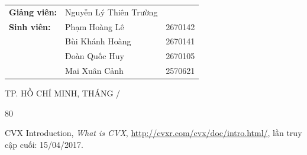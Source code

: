 \documentclass[a4paper,12pt]{article}
\begin{document}
\begin{titlepage}
\begin{minipage}{0.85\textwidth}
\raggedright

\begin{tabular}{@{}llr@{}}

\textbf{Giảng viên:}
    & Nguyễn Lý Thiên Trường & \\[6pt]

\textbf{Sinh viên:}
    & Phạm Hoàng Lê & 2670142 \\[4pt]

    & Bùi Khánh Hoàng & 2670141 \\[4pt]

    & Đoàn Quốc Huy & 2670105 \\[4pt]

    & Mai Xuân Cảnh & 2570621 \\

\end{tabular}

\end{minipage}

\vspace{1.2cm}

{\small
TP. HỒ CHÍ MINH,
THÁNG \the\month/\the\year\par}

\end{titlepage}



\tableofcontents
\clearpage

\listoffigures
\clearpage

\listoftables
\clearpage











\clearpage
{}
{}

\begin{thebibliography}{80}

CVX Introduction,
\textit{What is CVX},
\url{http://cvxr.com/cvx/doc/intro.html/},
lần truy cập cuối: 15/04/2017.

\end{thebibliography}

\end{document}
